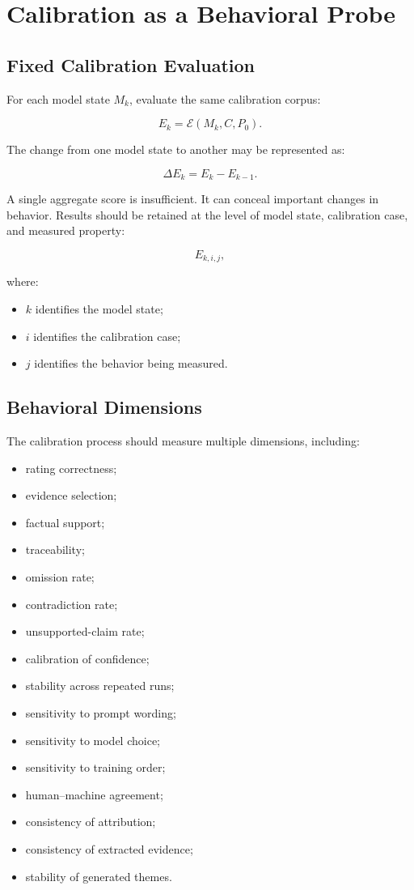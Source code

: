 \documentclass[11pt]{report}
\newcommand{\Ecal}{\mathcal{E}}
\begin{document}
\chapter{Calibration as a Behavioral Probe}

\section{Fixed Calibration Evaluation}

For each model state $M_k$, evaluate the same calibration corpus:

\[
E_k
=
\Ecal(M_k,C,P_0).
\]

The change from one model state to another may be represented as:

\[
\Delta E_k=E_k-E_{k-1}.
\]

A single aggregate score is insufficient. It can conceal important changes in behavior. Results should be retained at the level of model state, calibration case, and measured property:

\[
E_{k,i,j},
\]

where:

\begin{itemize}
  \item $k$ identifies the model state;
  \item $i$ identifies the calibration case;
  \item $j$ identifies the behavior being measured.
\end{itemize}

\section{Behavioral Dimensions}

The calibration process should measure multiple dimensions, including:

\begin{itemize}
  \item rating correctness;
  \item evidence selection;
  \item factual support;
  \item traceability;
  \item omission rate;
  \item contradiction rate;
  \item unsupported-claim rate;
  \item calibration of confidence;
  \item stability across repeated runs;
  \item sensitivity to prompt wording;
  \item sensitivity to model choice;
  \item sensitivity to training order;
  \item human--machine agreement;
  \item consistency of attribution;
  \item consistency of extracted evidence;
  \item stability of generated themes.
\end{itemize}
\end{document}
